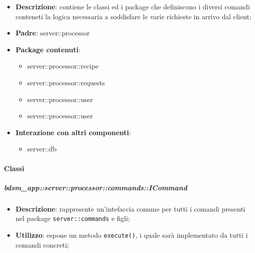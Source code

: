     \begin{itemize}
      \item \textbf{Descrizione}: contiene le classi ed i package che definiscono i diversi comandi conteneti la logica necessaria a soddisfare le varie richieste in arrivo dal client;
      \item \textbf{Padre}: server::processor
      \item \textbf{Package contenuti}:
        \begin{itemize}
          \item server::processor::recipe
          \item server::processor::requests
          \item server::processor::user
          \item server::processor::user
        \end{itemize}
      \item \textbf{Interazione con altri componenti}:
        \begin{itemize}
          \item server::db
        \end{itemize}
    \end{itemize}

      \paragraph{Classi} %

      \subparagraph{bdsm\_app::server::processor::commands::ICommand} %
      \label{subp:bdsm_app_server_processor_commands_icommand}
      \begin{itemize}
        \item \textbf{Descrizione}: rappresente un'intefaccia comune per tutti i comandi presenti nel package \texttt{server::commands} e figli;
        \item \textbf{Utilizzo}: espone un metodo \texttt{execute()}, i quale sarà implementato da tutti i comandi concreti;
      \end{itemize}


